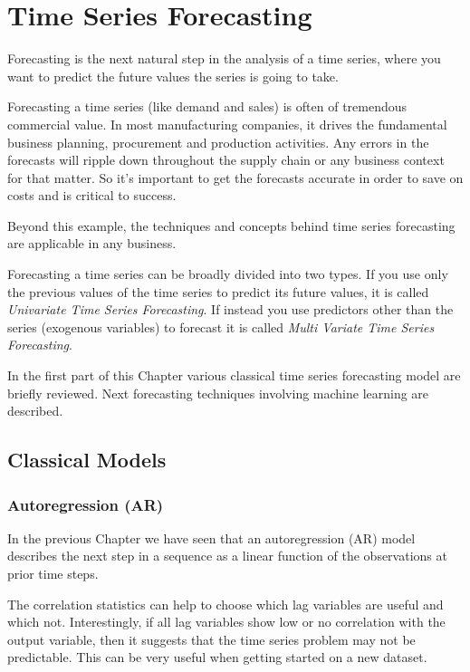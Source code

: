 \chapter{Time Series Forecasting}\label{time-series-forecasting}

Forecasting is the next natural step in the analysis of a time series,
where you want to predict the future values the series is going to take.

Forecasting a time series (like demand and sales) is often of tremendous
commercial value. In most manufacturing companies, it drives the
fundamental business planning, procurement and production activities.
Any errors in the forecasts will ripple down throughout the supply chain
or any business context for that matter. So it's important to get the
forecasts accurate in order to save on costs and is critical to success.

Beyond this example, the techniques and concepts behind time series
forecasting are applicable in any business.

Forecasting a time series can be broadly divided into two types. If you
use only the previous values of the time series to predict its future
values, it is called \emph{Univariate Time Series Forecasting}. If
instead you use predictors other than the series (exogenous
variables) to forecast it is called
\emph{Multi Variate Time Series Forecasting}.

In the first part of this Chapter various classical time series forecasting model are
briefly reviewed. Next forecasting techniques involving machine learning
are described.

\section{Classical Models}
\subsection{Autoregression (AR)}\label{autoregression-ar}

In the previous Chapter we have seen that an autoregression (AR) model
describes the next step in a sequence as a linear function of the
observations at prior time steps.

The correlation statistics can help to choose which lag variables
are useful and which not. Interestingly, if all lag
variables show low or no correlation with the output variable, then it
suggests that the time series problem may not be predictable. This can
be very useful when getting started on a new dataset.

